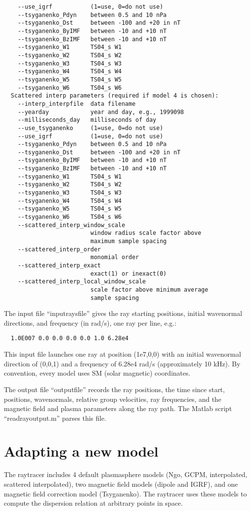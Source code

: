 \documentclass[10pt]{article}
\begin{document}
\begin{verbatim}
    --use_igrf           (1=use, 0=do not use)
    --tsyganenko_Pdyn    between 0.5 and 10 nPa
    --tsyganenko_Dst     between -100 and +20 in nT
    --tsyganenko_ByIMF   between -10 and +10 nT
    --tsyganenko_BzIMF   between -10 and +10 nT
    --tsyganenko_W1      TS04_s W1
    --tsyganenko_W2      TS04_s W2
    --tsyganenko_W3      TS04_s W3
    --tsyganenko_W4      TS04_s W4
    --tsyganenko_W5      TS04_s W5
    --tsyganenko_W6      TS04_s W6
  Scattered interp parameters (required if model 4 is chosen):
    --interp_interpfile  data filename
    --yearday            year and day, e.g., 1999098
    --milliseconds_day   milliseconds of day
    --use_tsyganenko     (1=use, 0=do not use)
    --use_igrf           (1=use, 0=do not use)
    --tsyganenko_Pdyn    between 0.5 and 10 nPa
    --tsyganenko_Dst     between -100 and +20 in nT
    --tsyganenko_ByIMF   between -10 and +10 nT
    --tsyganenko_BzIMF   between -10 and +10 nT
    --tsyganenko_W1      TS04_s W1
    --tsyganenko_W2      TS04_s W2
    --tsyganenko_W3      TS04_s W3
    --tsyganenko_W4      TS04_s W4
    --tsyganenko_W5      TS04_s W5
    --tsyganenko_W6      TS04_s W6
    --scattered_interp_window_scale
                         window radius scale factor above
                         maximum sample spacing
    --scattered_interp_order
                         monomial order
    --scattered_interp_exact
                         exact(1) or inexact(0)
    --scattered_interp_local_window_scale
                         scale factor above minimum average
                         sample spacing
\end{verbatim}

The input file ``inputraysfile'' gives the ray starting positions,
initial wavenormal directions, and frequency (in rad/s), one ray per
line, e.g.:
\begin{verbatim}
  1.0E007 0.0 0.0 0.0 0.0 1.0 6.28e4
\end{verbatim}
This input file launches one ray at position (1e7,0,0) with an initial
wavenormal direction of (0,0,1) and a frequency of 6.28e4 rad/s
(approximately 10 kHz).  By convention, every model uses SM (solar
magnetic) coordinates.

The output file ``outputfile'' records the ray positions, the time
since start, positions, wavenormals, relative group velocities, ray
frequencies, and the magnetic field and plasma parameters along the
ray path.  The Matlab script ``readrayoutput.m'' parses this file.

\section{Adapting a new model}
The raytracer includes 4 default plasmasphere models (Ngo, GCPM,
interpolated, scattered interpolated), two magnetic field models
(dipole and IGRF), and one magnetic field correction model
(Tsyganenko).  The raytracer uses these models to compute the
dispersion relation at arbitrary points in space.
\end{document}
